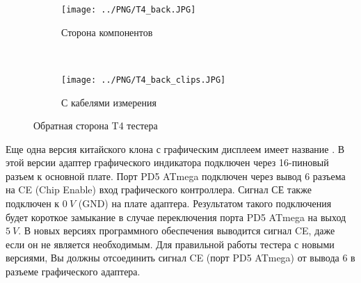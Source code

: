 \begin{figure}[H]
  \begin{subfigure}[b]{.5\textwidth}
    \centering
    \texttt{[image: ../PNG/T4\_back.JPG]}
    \caption{Сторона компонентов}
  \end{subfigure}
  ~
  \begin{subfigure}[b]{.5\textwidth}
    \centering
    \texttt{[image: ../PNG/T4\_back\_clips.JPG]}
    \caption{С кабелями измерения}
  \end{subfigure}
  \caption{Обратная сторона T4 тестера}
  \label{fig:T4_back}
\end{figure}
Еще одна версия китайского клона с графическим дисплеем имеет название .
В этой версии адаптер графического индикатора подключен через 16-пиновый разъем к основной плате.
Порт PD5 ATmega подключен через вывод 6 разъема на CE (Chip Enable) вход 
графического контроллера.
Сигнал СЕ также подключен к \(0~V\) (GND) на плате адаптера.
Результатом такого подключения будет короткое замыкание в случае переключения порта PD5 ATmega на
выход \(5~V\).
В новых версиях программного обеспечения выводится сигнал CE, даже если он не является необходимым.
Для правильной работы  тестера с новыми версиями, Вы должны отсоединить сигнал CE (порт PD5 ATmega)
от вывода 6 в разъеме графического адаптера.
